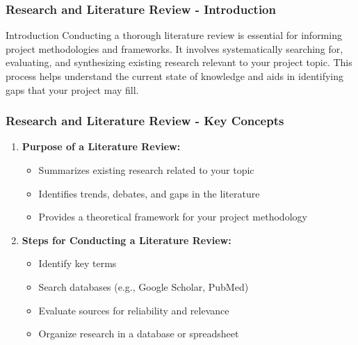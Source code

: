 \documentclass[aspectratio=169]{beamer}
\begin{document}
\begin{frame}[fragile]
    \frametitle{Research and Literature Review - Introduction}
    \begin{block}{Introduction}
        Conducting a thorough literature review is essential for informing project methodologies and frameworks. It involves systematically searching for, evaluating, and synthesizing existing research relevant to your project topic. This process helps understand the current state of knowledge and aids in identifying gaps that your project may fill.
    \end{block}
\end{frame}

\begin{frame}[fragile]
    \frametitle{Research and Literature Review - Key Concepts}
    \begin{enumerate}
        \item \textbf{Purpose of a Literature Review:}
            \begin{itemize}
                \item Summarizes existing research related to your topic
                \item Identifies trends, debates, and gaps in the literature
                \item Provides a theoretical framework for your project methodology
            \end{itemize}
        
        \item \textbf{Steps for Conducting a Literature Review:}
            \begin{itemize}
                \item Identify key terms
                \item Search databases (e.g., Google Scholar, PubMed)
                \item Evaluate sources for reliability and relevance
                \item Organize research in a database or spreadsheet
            \end{itemize}
    \end{enumerate}
\end{frame}
\end{document}
